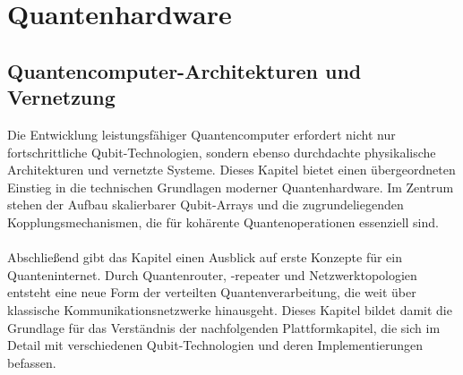 

\chapter{Quantenhardware}
\label{hardware} %



\section{Quantencomputer-Architekturen und Vernetzung}
Die Entwicklung leistungsfähiger Quantencomputer erfordert nicht nur fortschrittliche Qubit-Technologien, sondern ebenso durchdachte physikalische Architekturen und vernetzte Systeme. Dieses Kapitel bietet einen übergeordneten Einstieg in die technischen Grundlagen moderner Quantenhardware. Im Zentrum stehen der Aufbau skalierbarer Qubit-Arrays und die zugrundeliegenden Kopplungsmechanismen, die für kohärente Quantenoperationen essenziell sind.
\\\\
Abschließend gibt das Kapitel einen Ausblick auf erste Konzepte für ein Quanteninternet. Durch Quantenrouter, -repeater und Netzwerktopologien entsteht eine neue Form der verteilten Quantenverarbeitung, die weit über klassische Kommunikationsnetzwerke hinausgeht. Dieses Kapitel bildet damit die Grundlage für das Verständnis der nachfolgenden Plattformkapitel, die sich im Detail mit verschiedenen Qubit-Technologien und deren Implementierungen befassen.
